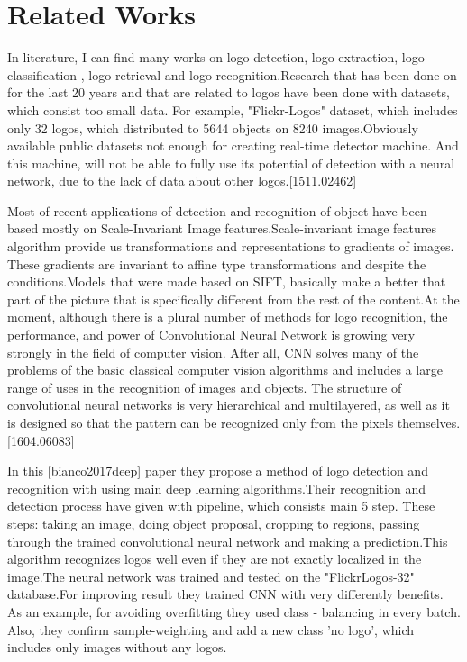 \section{Related Works}\label{sec:1.2}
\vspace{-0.5cm}
\noindent In literature, I can find many works on logo detection, logo extraction, logo classification , logo retrieval and logo recognition.Research that has been done on for the last 20 years and that are related to logos have been done with datasets, which consist too small data. For example, "Flickr-Logos" dataset, which includes only 32 logos, which distributed to 5644 objects on 8240 images.Obviously available public datasets not enough for creating real-time detector machine. And this machine, will not be able to fully use its potential of detection with a neural network, due to the lack of data about other logos.[1511.02462]

\vspace{-0.3cm}
\par Most of recent applications of detection and recognition of object have been based mostly on Scale-Invariant Image features.Scale-invariant image features algorithm provide us transformations and representations to gradients of images. These gradients are invariant to affine type transformations and despite the conditions.Models that were made based on SIFT, basically make a better that part of the picture that is specifically different from the rest of the content.At the moment, although there is a plural number of methods for logo recognition, the performance, and power of Convolutional Neural Network is growing very strongly in the field of computer vision. After all, CNN solves many of the problems of the basic classical computer vision algorithms and includes a large range of uses in the recognition of images and objects. The structure of convolutional neural networks is very hierarchical and multilayered, as well as it is designed so that the pattern can be recognized only from the pixels themselves.[1604.06083]


\vspace{-0.3cm}
\par In this [bianco2017deep] paper they propose a method of logo detection and recognition with using main deep learning algorithms.Their recognition and detection process have given with pipeline, which consists main 5 step. These steps: taking an image, doing object proposal, cropping to regions, passing through the trained convolutional neural network and making a prediction.This algorithm recognizes logos well even if they are not exactly localized in the image.The neural network was trained and tested on the "FlickrLogos-32" database.For improving result they trained CNN with very differently benefits. As an example, for avoiding overfitting they used class - balancing in every batch. Also, they confirm sample-weighting and add a new class  'no logo', which includes only images without any logos.



